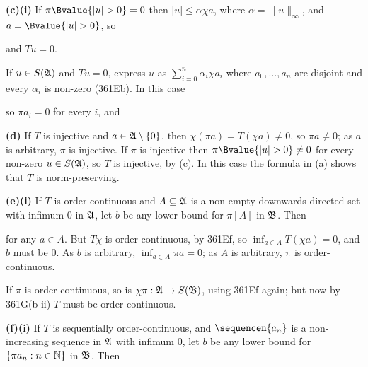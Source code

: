 {{\bf (c)(i)} If $\pi\Bvalue{|u|>0}=0$ then
$|u|\le\alpha\chi a$, where $\alpha=\|u\|_{\infty}$,
and $a=\Bvalue{|u|>0}$, so


\noindent and $Tu=0$.

\medskip

 If $u\in S(\frak A)$ and
$Tu=0$, express $u$ as $\sum_{i=0}^n\alpha_i\chi a_i$ where
$a_0,\ldots,a_n$ are disjoint and every $\alpha_i$ is non-zero (361Eb).
In this case


\noindent so $\pi a_i=0$ for every $i$, and


\medskip

{\bf (d)} If $T$ is injective and $a\in\frak A\setminus\{0\}$,
then $\chi(\pi a)=T(\chi a)\ne 0$, so $\pi a\ne 0$;  as $a$ is
arbitrary, $\pi$ is injective.   If $\pi$ is injective then
$\pi\Bvalue{|u|>0}\ne 0$ for every non-zero $u\in S(\frak A)$, so $T$ is
injective, by (c).
In this case the formula in (a) shows that $T$ is norm-preserving.

\medskip

{\bf (e)(i)}  If $T$ is order-continuous and $A\subseteq\frak A$
is a non-empty downwards-directed set with infimum $0$ in $\frak A$, let
$b$ be any lower bound for $\pi[A]$ in $\frak B$.   Then


\noindent for any $a\in A$.   But $T\chi$ is order-continuous, by
361Ef, so $\inf_{a\in A}T(\chi a)=0$, and $b$ must be $0$.   As
$b$ is arbitrary, $\inf_{a\in A}\pi a=0$;  as  $A$ is arbitrary, $\pi$
is order-continuous.

\medskip

  If $\pi$ is order-continuous, so is
$\chi\pi:\frak A\to S(\frak B)$, using 361Ef again;  but now by
361G(b-ii) $T$ must be order-continuous.

\medskip

{\bf (f)(i)}  If $T$ is sequentially order-continuous, and
$\sequencen{a_n}$ is a non-increasing sequence in $\frak A$ with infimum
$0$, let $b$ be any lower bound for $\{\pi a_n:n\in\Bbb N\}$ in
$\frak B$.   Then


}
